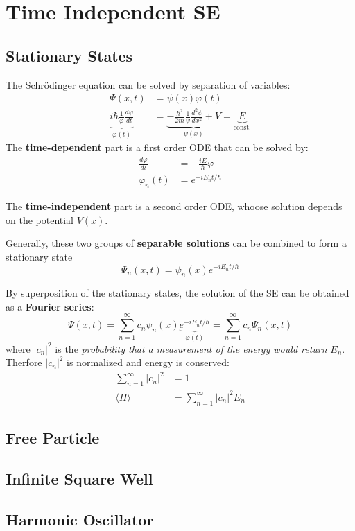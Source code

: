 \section{Time Independent SE}

\subsection{Stationary States}
The Schrödinger equation can be solved by separation of variables:
\noindent\begin{align*}
    \Psi(x,t)                                                        & = \psi(x)\varphi(t)                                                                                          \\
    \underbrace{i\hbar\frac1\varphi\frac{d\varphi}{dt}}_{\varphi(t)} & =\underbrace{-\frac{\hbar^2}{2m}\frac1\psi\frac{d^2\psi}{dx^2}+V}_{\psi(x)} = \underbrace{E}_{\text{const.}}
\end{align*}
The \textbf{time-dependent} part is a first order ODE that can be solved by:
\noindent\begin{align*}
    \frac{d\varphi}{d\iota} & =-\frac{iE}{\hbar}\varphi \\
    \varphi_n(t)              & =e^{-iE_n t/\hbar}
\end{align*}

The \textbf{time-independent} part is a second order ODE, whoose solution depends on the potential $V(x)$.

\newpar{}
Generally, these two groups of \textbf{separable solutions} can be combined to form a stationary state
\noindent\begin{equation*}
    \Psi_n(x,t)=\psi_n(x)e^{-iE_nt/\hbar}
\end{equation*}

By superposition of the stationary states, the solution of the SE can be obtained as a \textbf{Fourier series}:
\noindent\begin{equation*}
    \Psi(x,t) =\sum_{n=1}^\infty c_n\psi_n(x) \underbrace{e^{-iE_n t/\hbar}}_{\varphi(t)}=\sum_{n=1}^\infty c_n\Psi_n(x,t)
\end{equation*}
where $|c_n|^2$ is the \textit{probability that a measurement of the energy would return} $E_n$. Therfore $|c_n|^2$ is normalized and energy is conserved:
\noindent\begin{align*}
    \sum_{n=1}^\infty|c_n|^2&=1\\
    \langle H\rangle&=\sum_{n=1}^\infty|c_n|^2E_n
\end{align*}


\subsection{Free Particle}

\subsection{Infinite Square Well}

\subsection{Harmonic Oscillator}